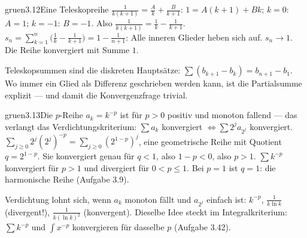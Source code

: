 \begin{loesungkarte}{gruen}{3.12}{Eine Teleskopreihe}
$\frac1{k(k + 1)} = \frac Ak + \frac B{k + 1}$: $1 = A(k + 1) + Bk$; $k = 0$: $A = 1$; $k = -1$: $B = -1$. Also $\frac1{k(k + 1)} = \frac1k - \frac1{k + 1}$.
$s_n = \sum_{k=1}^{n}\bigl(\frac1k - \frac1{k + 1}\bigr) = 1 - \frac1{n + 1}$: Alle inneren Glieder heben sich auf.
$s_n\to1$. Die Reihe konvergiert mit Summe $1$.
\begin{mitnehmen}\kastentext
Teleskopsummen sind die diskreten Hauptsätze: $\sum(b_{k+1} - b_k) = b_{n+1} - b_1$. Wo immer ein Glied als Differenz geschrieben werden kann, ist die Partialsumme explizit --- und damit die Konvergenzfrage trivial.
\end{mitnehmen}
\end{loesungkarte}

\begin{loesungkarte}{gruen}{3.13}{Die $p$-Reihe}
$a_k = k^{-p}$ ist für $p > 0$ positiv und monoton fallend --- das verlangt das Verdichtungskriterium: $\sum a_k$ konvergiert $\iff\sum2^{j}a_{2^{j}}$ konvergiert.
$\sum_{j\ge0}2^{j}(2^{j})^{-p} = \sum_{j\ge0}(2^{1 - p})^{j}$, eine geometrische Reihe mit Quotient $q = 2^{1 - p}$. Sie konvergiert genau für $q < 1$, also $1 - p < 0$, also $p > 1$.
$\sum k^{-p}$ konvergiert für $p > 1$ und divergiert für $0 < p\le1$. Bei $p = 1$ ist $q = 1$: die harmonische Reihe (Aufgabe 3.9).
\begin{mitnehmen}\kastentext
Verdichtung lohnt sich, wenn $a_k$ monoton fällt und $a_{2^{j}}$ einfach ist: $k^{-p}$, $\frac1{k\ln k}$ (divergent!), $\frac1{k(\ln k)^{2}}$ (konvergent). Dieselbe Idee steckt im Integralkriterium: $\sum k^{-p}$ und $\int x^{-p}$ konvergieren für dasselbe $p$ (Aufgabe 3.42).
\end{mitnehmen}
\end{loesungkarte}

